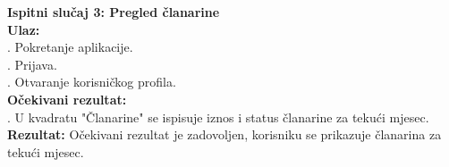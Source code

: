 \documentclass[times, utf8, zavrsni]{fer}
\begin{document}
	    \noindent \textbf{Ispitni slučaj 3: Pregled članarine}\\
			\textbf{Ulaz:}\\
			    . Pokretanje aplikacije.\\
			    . Prijava.\\
			    . Otvaranje korisničkog profila.\\
			   
			\noindent\textbf{Očekivani rezultat:}\\
			    . U kvadratu "Članarine" se ispisuje iznos i status članarine za tekući mjesec.\\
			    
			\noindent\textbf{Rezultat:}
			    \noindent Očekivani rezultat je zadovoljen, korisniku se prikazuje članarina za tekući mjesec.
			    
\end{document}

